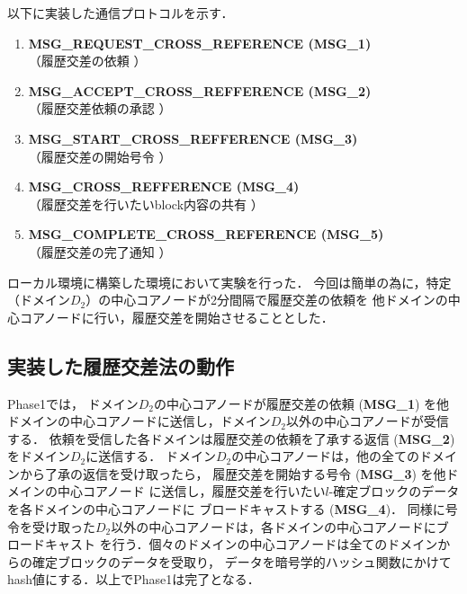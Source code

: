 \documentclass[a4paper,12pt]{jsarticle}
\begin{document}
以下に実装した通信プロトコルを示す．

\hspace{5mm}
%
\begin{enumerate}
\item \textbf{MSG\_REQUEST\_CROSS\_REFERENCE (MSG\_1)}\\
\hspace{12mm} （履歴交差の依頼 ）
\item \textbf{MSG\_ACCEPT\_CROSS\_REFFERENCE (MSG\_2)}\\
\hspace{12mm}  （履歴交差依頼の承認 ）
  \item \textbf{MSG\_START\_CROSS\_REFFERENCE (MSG\_3)}\\
\hspace{12mm}  （履歴交差の開始号令 ）
  \item \textbf{MSG\_CROSS\_REFFERENCE (MSG\_4)}\\
\hspace{12mm}  （履歴交差を行いたいblock内容の共有 ）
  \item \textbf{MSG\_COMPLETE\_CROSS\_REFERENCE (MSG\_5)} \\
\hspace{12mm}  （履歴交差の完了通知 ）
\end{enumerate}
%
\hspace{5mm}

ローカル環境に構築した環境において実験を行った．
今回は簡単の為に，特定（ドメイン$D_2$）の中心コアノードが2分間隔で履歴交差の依頼を
他ドメインの中心コアノードに行い，履歴交差を開始させることとした．

\subsection{実装した履歴交差法の動作}
Phase1では，
ドメイン$D_2$の中心コアノードが履歴交差の依頼 (\textbf{MSG\_1})
を他ドメインの中心コアノードに送信し，ドメイン$D_2$以外の中心コアノードが受信する．
依頼を受信した各ドメインは履歴交差の依頼を了承する返信 (\textbf{MSG\_2})
をドメイン$D_2$に送信する．
ドメイン$D_2$の中心コアノードは，他の全てのドメインから了承の返信を受け取ったら，
履歴交差を開始する号令 (\textbf{MSG\_3}) を他ドメインの中心コアノード
に送信し，履歴交差を行いたい$l$-確定ブロックのデータを各ドメインの中心コアノードに
ブロードキャストする (\textbf{MSG\_4})．
同様に号令を受け取った$D_2$以外の中心コアノードは，各ドメインの中心コアノードにブロードキャスト
を行う．個々のドメインの中心コアノードは全てのドメインからの確定ブロックのデータを受取り，
データを暗号学的ハッシュ関数にかけてhash値にする．以上でPhase1は完了となる．
\end{document}
